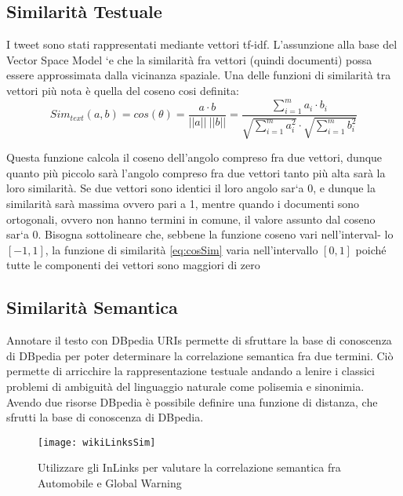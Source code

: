 \subsection{Similarità Testuale}
\label{sec:simtext}
I tweet sono stati rappresentati mediante vettori tf-idf. L'assunzione alla base
del Vector Space Model `e che la similarità fra vettori (quindi documenti) possa essere approssimata dalla vicinanza spaziale. Una delle funzioni di similarità tra vettori più nota è quella del coseno \cite{Zobel:1998:ESS:281250.281256} cosi definita:
\begin{equation}
\label{eq:cosSim}
Sim_{text}(a,b)=cos(\theta)=\frac{a \cdot  b}{||a||\:||b||}=\frac{\sum_{i=1}^m a_i\cdot  b_i}{\sqrt{\sum_{i=1}^m a_i^2} \cdot \sqrt{\sum_{i=1}^m b_i^2}}
\end{equation}

Questa funzione calcola il coseno dell'angolo compreso fra due vettori, dunque
quanto più piccolo sarà l'angolo compreso fra due vettori tanto più alta sarà
la loro similarità. Se due vettori sono identici il loro angolo sar`a 0, e dunque
la similarità sarà massima ovvero pari a 1, mentre quando i documenti sono
ortogonali, ovvero non hanno termini in comune, il valore assunto dal coseno
sar`a 0. Bisogna sottolineare che, sebbene la funzione coseno vari nell’interval-
lo $[−1, 1]$, la funzione di similarità \ref{eq:cosSim}  varia nell'intervallo $[0, 1]$ poiché tutte
le componenti dei vettori sono maggiori di zero

\subsection{Similarità Semantica}
\label{sec:simSem}

Annotare il testo con DBpedia URIs permette di sfruttare la base di conoscenza di DBpedia per poter determinare la correlazione semantica fra due termini. Ciò permette di arricchire la rappresentazione testuale andando a lenire
i classici problemi di ambiguità del linguaggio naturale come polisemia e
sinonimia. Avendo due risorse DBpedia è possibile definire una funzione di
distanza, che sfrutti la base di conoscenza di DBpedia.

 

 \begin{figure}[h]
    \centering
    \texttt{[image: wikiLinksSim]}
    \caption{Utilizzare gli InLinks per valutare la correlazione semantica fra Automobile e Global Warning}
  \label{fig:wikiLinkSim}
  \end{figure}  

